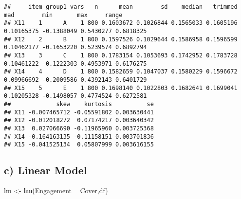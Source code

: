 \documentclass[
]{article}
\newenvironment{Shaded}{\begin{snugshade}}{\end{snugshade}}
\newcommand{\DataTypeTok}[1]{\textcolor[rgb]{0.13,0.29,0.53}{#1}}
\newcommand{\KeywordTok}[1]{\textcolor[rgb]{0.13,0.29,0.53}{\textbf{#1}}}
\newcommand{\NormalTok}[1]{#1}
\newcommand{\OperatorTok}[1]{\textcolor[rgb]{0.81,0.36,0.00}{\textbf{#1}}}
\newcommand{\StringTok}[1]{\textcolor[rgb]{0.31,0.60,0.02}{#1}}
\begin{document}
\begin{Shaded}
\end{Shaded}

\begin{verbatim}
##     item group1 vars   n      mean        sd    median   trimmed        mad        min       max     range
## X11    1      A    1 800 0.1603672 0.1026844 0.1565033 0.1605196 0.10165375 -0.1388049 0.5430277 0.6818325
## X12    2      B    1 800 0.1597526 0.1029644 0.1586958 0.1596599 0.10462177 -0.1653220 0.5239574 0.6892794
## X13    3      C    1 800 0.1783154 0.1053693 0.1742952 0.1783728 0.10461222 -0.1222303 0.4953971 0.6176275
## X14    4      D    1 800 0.1582659 0.1047037 0.1580229 0.1596672 0.09966692 -0.2009586 0.4392143 0.6401729
## X15    5      E    1 800 0.1698140 0.1022803 0.1682641 0.1699041 0.10205328 -0.1498057 0.4774524 0.6272581
##             skew    kurtosis          se
## X11 -0.007465712 -0.05591802 0.003630441
## X12 -0.012018272  0.07174217 0.003640342
## X13  0.027066690 -0.11965960 0.003725368
## X14 -0.164163135 -0.11158151 0.003701836
## X15 -0.041525134  0.05807999 0.003616155
\end{verbatim}

\hypertarget{c-linear-model}{%
\subsection{c) Linear Model}\label{c-linear-model}}

\begin{Shaded}
\begin{Highlighting}[]
\NormalTok{lm <-}\StringTok{ }\KeywordTok{lm}\NormalTok{(Engagement }\OperatorTok{~}\StringTok{ }\NormalTok{Cover,df)}
\end{Highlighting}
\end{Shaded}
\end{document}
